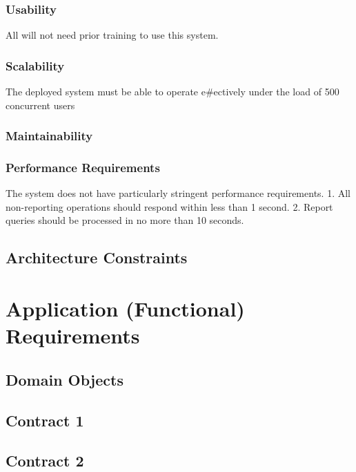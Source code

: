 \documentclass[12pt]{article}
\begin{document}
	                  	\subsubsection{Usability}
All will not need prior training to use this system.
	                  	
	                  	\subsubsection{Scalability}
The deployed system must be able to operate e#ectively under the load of 500 concurrent
 users
         	
	                  	\subsubsection{Maintainability}
	                  	
	                  	\subsubsection{Performance Requirements}
	                  	The system does not have particularly stringent performance requirements.
1. All non-reporting operations should respond within less than 1 second.
2. Report queries should be processed in no more than 10 seconds.
                	\subsection{Architecture Constraints}
                
                \section{Application (Functional) Requirements}
                	\subsection{Domain Objects}
                	
                	\subsection{Contract 1}
                	
                	\subsection{Contract 2}
                	
\end{document}
